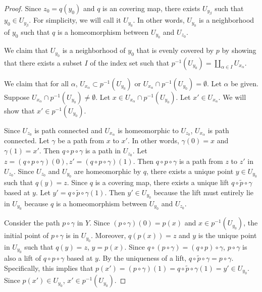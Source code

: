 \documentclass[12pt, psamsfonts]{amsart}
\theoremstyle{definition}
\theoremstyle{remark}
\numberwithin{equation}{section}
\begin{document}
\begin{proof}

  Since $z_0 = q(y_0)$ and $q$ is an covering map, there exists $U_{y_{\beta}}$ such that $y_0 \in U_{y_{\beta}}$.
  For simplicity, we will call it $U_{y_0}$.
  In other words, $U_{y_0}$ is a neighborhood of $y_0$ such that $q$ is a homeomorphism between $U_{y_0}$ and $U_{z_0}$.

  We claim that $U_{y_0}$ is a neighborhood of $y_0$ that is evenly covered by $p$ by showing that there exists a subset $I$ of the index set such that $p^{-1}(U_{y_0}) = \coprod_{\alpha \in I} U_{x_{\alpha}}$.


  We claim that for all $\alpha$, $U_{x_{\alpha}} \subset p^{-1}(U_{y_0})$ or $U_{x_{\alpha}} \cap p^{-1}(U_{y_0}) = \emptyset$.
  Let $\alpha$ be given.
  Suppose $U_{x_{\alpha}} \cap p^{-1}(U_{y_0}) \ne \emptyset$.
  Let $x \in U_{x_{\alpha}} \cap p^{-1}(U_{y_0})$.
  Let $x' \in U_{x_{\alpha}}$.
  We will show that $x' \in p^{-1}(U_{y_0})$.

  Since $U_{z_0}$ is path connected and $U_{x_{\alpha}}$ is homeomorphic to $U_{z_0}$, $U_{x_{\alpha}}$ is path connected.
  Let $\gamma$ be a path from $x$ to $x'$.
  In other words, $\gamma(0) = x$ and $\gamma(1) = x'$.
  Then $q \circ p \circ \gamma$ is a path in $U_{z_0}$.
  Let $z = (q \circ p \circ \gamma)(0), z' = (q \circ p \circ \gamma)(1)$.
  Then $q \circ p \circ \gamma$ is a path from $z$ to $z'$ in $U_{z_0}$.
  Since $U_{z_0}$ and $U_{y_0}$ are homeomorphic by $q$, there exists a unique point $y \in U_{y_0}$ such that $q(y) = z$.
  Since $q$ is a covering map, there exists a unique lift $\widetilde{q \circ p \circ \gamma}$ based at $y$.
  Let $y' = \widetilde{q \circ p \circ \gamma}(1)$.
  Then $y' \in U_{y_0}$ because the lift must entirely lie in $U_{y_0}$ because $q$ is a homeomorphism between $U_{y_0}$ and $U_{z_0}$.

  Consider the path $p \circ \gamma$ in $Y$.
  Since $(p \circ \gamma)(0) = p(x)$ and $x \in p^{-1}(U_{y_0})$, the initial point of $p \circ \gamma$ is in $U_{y_0}$.
  Moreover, $q(p(x)) = z$ and $y$ is the unique point in $U_{y_0}$ such that $q(y) = z$, $y = p(x)$.
  Since $q \circ (p \circ \gamma) = (q \circ p) \circ \gamma$, $p \circ \gamma$ is also a lift of $q \circ p \circ \gamma$ based at $y$.
  By the uniqueness of a lift, $\widetilde{q \circ p \circ \gamma} = p \circ \gamma$.
  Specifically, this implies that $p(x') = (p \circ \gamma)(1) = \widetilde{q \circ p \circ \gamma}(1) = y' \in U_{y_0}$.
  Since $p(x') \in U_{y_0}$, $x' \in p^{-1}(U_{y_0})$.


\end{proof}
\end{document}
